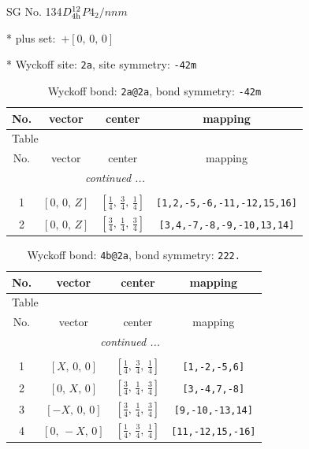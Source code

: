 \documentclass[fleqn,8pt]{jsarticle}
\begin{document}
\setcounter{MaxMatrixCols}{32}

\renewcommand{\tablename}{Table~}
\renewcommand{\figurename}{Figure~}
\begin{center}
\LARGE
SG No. 134\quad$D_{\rm 4h}^{12}$\quad$P4_2/nnm$\quad[ tetragonal ]
\end{center}

* plus set:\,\,\,$+\left[ 0,\, 0,\, 0 \right]$


* Wyckoff site: {\tt 2a}, site symmetry: {\tt -42m}
\renewcommand{\arraystretch}{1.2}
\begin{longtable}{cccc}
\caption{Wyckoff bond: {\tt 2a@2a}, bond symmetry: {\tt -42m}}
 \\
 \hline \hline
No. & vector & center & mapping \\ \hline \endfirsthead

\multicolumn{3}{l}{\tablename\ \thetable{}} \\
 \hline \hline
No. & vector & center & mapping \\ \hline \endhead

 \hline \hline
\multicolumn{3}{r}{\footnotesize\it continued ...} \\ \endfoot

 \hline \hline
\multicolumn{3}{r}{} \\ \endlastfoot

1 & $\left[ 0,\, 0,\, Z \right]$ & $\left[ \frac{1}{4},\, \frac{3}{4},\, \frac{1}{4} \right]$ & {\tt [1,2,-5,-6,-11,-12,15,16]} \\ \hline
2 & $\left[ 0,\, 0,\, Z \right]$ & $\left[ \frac{3}{4},\, \frac{1}{4},\, \frac{3}{4} \right]$ & {\tt [3,4,-7,-8,-9,-10,13,14]} \\
\end{longtable}
\renewcommand{\arraystretch}{1.2}
\begin{longtable}{cccc}
\caption{Wyckoff bond: {\tt 4b@2a}, bond symmetry: {\tt 222.}}
 \\
 \hline \hline
No. & vector & center & mapping \\ \hline \endfirsthead

\multicolumn{3}{l}{\tablename\ \thetable{}} \\
 \hline \hline
No. & vector & center & mapping \\ \hline \endhead

 \hline \hline
\multicolumn{3}{r}{\footnotesize\it continued ...} \\ \endfoot

 \hline \hline
\multicolumn{3}{r}{} \\ \endlastfoot

1 & $\left[ X,\, 0,\, 0 \right]$ & $\left[ \frac{1}{4},\, \frac{3}{4},\, \frac{1}{4} \right]$ & {\tt [1,-2,-5,6]} \\ \hline
2 & $\left[ 0,\, X,\, 0 \right]$ & $\left[ \frac{3}{4},\, \frac{1}{4},\, \frac{3}{4} \right]$ & {\tt [3,-4,7,-8]} \\ \hline
3 & $\left[ - X,\, 0,\, 0 \right]$ & $\left[ \frac{3}{4},\, \frac{1}{4},\, \frac{3}{4} \right]$ & {\tt [9,-10,-13,14]} \\ \hline
4 & $\left[ 0,\, - X,\, 0 \right]$ & $\left[ \frac{1}{4},\, \frac{3}{4},\, \frac{1}{4} \right]$ & {\tt [11,-12,15,-16]} \\
\end{longtable}
\end{document}

